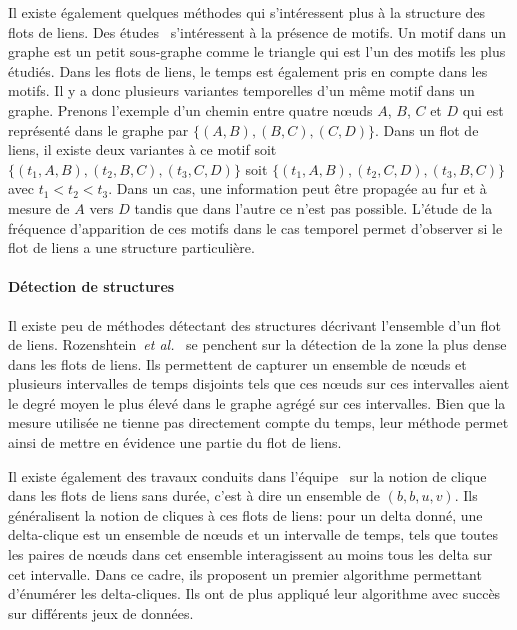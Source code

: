 Il existe également quelques méthodes qui s'intéressent plus à la structure des flots de liens.
Des études~\cite{Kovanen2011a,Kovanen2013a} s'intéressent à la présence de motifs.
Un motif dans un graphe est un petit sous-graphe comme le triangle qui est l'un des motifs les plus étudiés.
Dans les flots de liens, le temps est également pris en compte dans les motifs.
Il y a donc plusieurs variantes temporelles d'un même motif dans un graphe.
Prenons l'exemple d'un chemin entre quatre n\oe{}uds $A$, $B$, $C$ et $D$ qui est représenté dans le graphe par  $\{(A,B), (B,C), (C,D)\}$.
Dans un flot de liens, il existe deux variantes à ce motif soit
$\{(t_1,A,B), (t_2,B,C), (t_3,C,D)\}$ soit $\{(t_1,A,B), (t_2,C,D), (t_3,B,C)\}$ avec $t_1<t_2<t_3$.
Dans un cas,  une information peut être propagée au fur et à mesure de $A$ vers $D$ tandis que dans l'autre ce n'est pas possible.
L'étude de la fréquence d'apparition de ces motifs dans le cas temporel permet d'observer si le flot de liens a une structure particulière. 



\paragraph{Détection de structures}
Il existe peu de méthodes détectant des structures décrivant l'ensemble d'un flot de liens.
Rozenshtein~\emph{et al.}~\cite{rozenshtein2014} se penchent sur la détection de la zone la plus dense dans les flots de liens.
Ils permettent de capturer un ensemble de n\oe{}uds et plusieurs intervalles de temps disjoints tels que ces n\oe{}uds sur ces intervalles aient le degré moyen le plus élevé dans le graphe agrégé sur ces intervalles.
Bien que la mesure utilisée ne tienne pas directement compte du temps, leur méthode permet ainsi de mettre en évidence une partie du flot de liens.

Il existe également des travaux conduits dans l'équipe~\cite{Viard2016,viard:hal-01208330} sur la notion de clique  dans les flots de liens sans durée, c'est à dire un ensemble de $(b,b,u,v)$.
Ils généralisent la notion de cliques à ces flots de liens: pour un delta donné, une delta-clique est un ensemble de n\oe{}uds et un intervalle de temps, tels que toutes les paires de n\oe{}uds dans cet ensemble interagissent au moins tous les delta sur cet intervalle.
Dans ce cadre, ils proposent un premier algorithme permettant d’énumérer les delta-cliques.
Ils ont de plus appliqué leur algorithme avec succès sur différents jeux de données.



